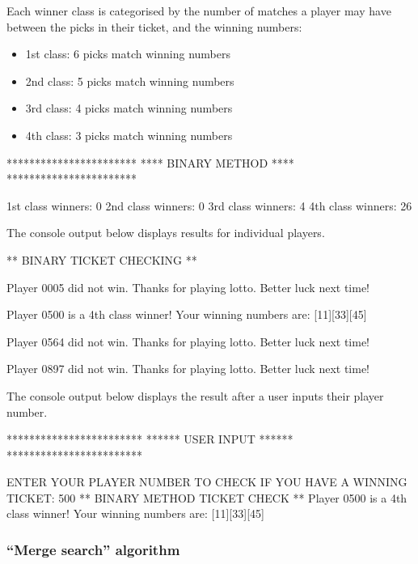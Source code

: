 Each winner class is categorised by the number of matches a player may have between the picks in their ticket, and the winning numbers:

\begin{itemize}
\item 1st class: 6 picks match winning numbers
\item 2nd class: 5 picks match winning numbers
\item 3rd class: 4 picks match winning numbers
\item 4th class: 3 picks match winning numbers
\end{itemize}

\begin{consolecode}
***********************
**** BINARY METHOD ****
***********************

1st class winners: 0
2nd class winners: 0
3rd class winners: 4
4th class winners: 26
\end{consolecode}

\noindent
The console output below displays results for individual players.
\\
\begin{consolecode}
** BINARY TICKET CHECKING **

Player 0005 did not win. Thanks for playing lotto. 
Better luck next time!

Player 0500 is a 4th class winner!
Your winning numbers are: [11][33][45]

Player 0564 did not win. Thanks for playing lotto. 
Better luck next time!

Player 0897 did not win. Thanks for playing lotto. 
Better luck next time!
\end{consolecode}

\noindent
The console output below displays the result after a user inputs their player number.
\\
\begin{consolecode}
************************
****** USER INPUT ******
************************

ENTER YOUR PLAYER NUMBER TO CHECK IF YOU HAVE A WINNING TICKET:
500
** BINARY METHOD TICKET CHECK **
Player 0500 is a 4th class winner!
Your winning numbers are: [11][33][45]
\end{consolecode}

\newpage
\subsubsection{``Merge search'' algorithm}

